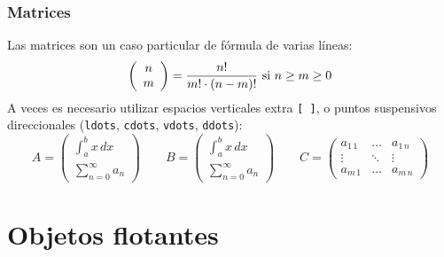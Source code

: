 \documentclass[12pt]{article}
\begin{document}
	\subsubsection{Matrices}
	Las matrices son un caso particular de fórmula de varias líneas:
	\[
	\left(
	\begin{array}{c}
	n \\
	m
	\end{array}
	\right)=\frac{n!}{m! \cdot (n-m)!} \textnormal{ si }n \geq m \geq 0
	\]
	A veces es necesario utilizar espacios verticales extra \texttt{[ ]}, o puntos suspensivos direccionales (\texttt{ldots}, \texttt{cdots}, \texttt{vdots}, \texttt{ddots}):
	\[
	A=\left(
	\begin{array}{c}
	\displaystyle\int_a^b x \, dx \\
	\displaystyle\sum_{n=0}^\infty a_n 
	\end{array}
	\right) 
	\qquad
	B=\left(
	\begin{array}{c}
	\displaystyle\int_a^b x \, dx \\ [0.5cm]
	\displaystyle\sum_{n=0}^\infty a_n 
	\end{array}
	\right)
	\qquad
	C=
	\left(
	\begin{array}{ccc}
	a_{1\,1} & \ldots & a_{1\,n} \\
	\vdots   & \ddots & \vdots \\
	a_{m\,1} & \ldots & a_{m\,n}
	\end{array}
	\right)
	\]
	\section{Objetos flotantes}
\end{document}
